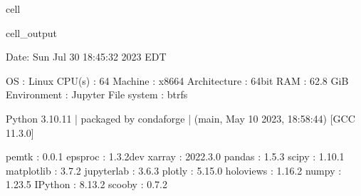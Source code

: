 \documentclass[letterpaper,table,10pt,english]{jupyterBook}
\begin{document}
\begin{sphinxuseclass}{cell}
\begin{sphinxVerbatimOutput}
\begin{sphinxuseclass}{cell_output}
\begin{sphinxVerbatim}[commandchars=\\\{\}]
\PYGZhy{}\PYGZhy{}\PYGZhy{}\PYGZhy{}\PYGZhy{}\PYGZhy{}\PYGZhy{}\PYGZhy{}\PYGZhy{}\PYGZhy{}\PYGZhy{}\PYGZhy{}\PYGZhy{}\PYGZhy{}\PYGZhy{}\PYGZhy{}\PYGZhy{}\PYGZhy{}\PYGZhy{}\PYGZhy{}\PYGZhy{}\PYGZhy{}\PYGZhy{}\PYGZhy{}\PYGZhy{}\PYGZhy{}\PYGZhy{}\PYGZhy{}\PYGZhy{}\PYGZhy{}\PYGZhy{}\PYGZhy{}\PYGZhy{}\PYGZhy{}\PYGZhy{}\PYGZhy{}\PYGZhy{}\PYGZhy{}\PYGZhy{}\PYGZhy{}\PYGZhy{}\PYGZhy{}\PYGZhy{}\PYGZhy{}\PYGZhy{}\PYGZhy{}\PYGZhy{}\PYGZhy{}\PYGZhy{}\PYGZhy{}\PYGZhy{}\PYGZhy{}\PYGZhy{}\PYGZhy{}\PYGZhy{}\PYGZhy{}\PYGZhy{}\PYGZhy{}\PYGZhy{}\PYGZhy{}\PYGZhy{}\PYGZhy{}\PYGZhy{}\PYGZhy{}\PYGZhy{}\PYGZhy{}\PYGZhy{}\PYGZhy{}\PYGZhy{}\PYGZhy{}\PYGZhy{}\PYGZhy{}\PYGZhy{}\PYGZhy{}\PYGZhy{}\PYGZhy{}\PYGZhy{}\PYGZhy{}\PYGZhy{}\PYGZhy{}
  Date: Sun Jul 30 18:45:32 2023 EDT

                OS : Linux
            CPU(s) : 64
           Machine : x86\PYGZus{}64
      Architecture : 64bit
               RAM : 62.8 GiB
       Environment : Jupyter
       File system : btrfs

  Python 3.10.11 | packaged by conda\PYGZhy{}forge | (main, May 10 2023, 18:58:44)
  [GCC 11.3.0]

             pemtk : 0.0.1
           epsproc : 1.3.2\PYGZhy{}dev
            xarray : 2022.3.0
            pandas : 1.5.3
             scipy : 1.10.1
        matplotlib : 3.7.2
        jupyterlab : 3.6.3
            plotly : 5.15.0
         holoviews : 1.16.2
             numpy : 1.23.5
           IPython : 8.13.2
            scooby : 0.7.2
\PYGZhy{}\PYGZhy{}\PYGZhy{}\PYGZhy{}\PYGZhy{}\PYGZhy{}\PYGZhy{}\PYGZhy{}\PYGZhy{}\PYGZhy{}\PYGZhy{}\PYGZhy{}\PYGZhy{}\PYGZhy{}\PYGZhy{}\PYGZhy{}\PYGZhy{}\PYGZhy{}\PYGZhy{}\PYGZhy{}\PYGZhy{}\PYGZhy{}\PYGZhy{}\PYGZhy{}\PYGZhy{}\PYGZhy{}\PYGZhy{}\PYGZhy{}\PYGZhy{}\PYGZhy{}\PYGZhy{}\PYGZhy{}\PYGZhy{}\PYGZhy{}\PYGZhy{}\PYGZhy{}\PYGZhy{}\PYGZhy{}\PYGZhy{}\PYGZhy{}\PYGZhy{}\PYGZhy{}\PYGZhy{}\PYGZhy{}\PYGZhy{}\PYGZhy{}\PYGZhy{}\PYGZhy{}\PYGZhy{}\PYGZhy{}\PYGZhy{}\PYGZhy{}\PYGZhy{}\PYGZhy{}\PYGZhy{}\PYGZhy{}\PYGZhy{}\PYGZhy{}\PYGZhy{}\PYGZhy{}\PYGZhy{}\PYGZhy{}\PYGZhy{}\PYGZhy{}\PYGZhy{}\PYGZhy{}\PYGZhy{}\PYGZhy{}\PYGZhy{}\PYGZhy{}\PYGZhy{}\PYGZhy{}\PYGZhy{}\PYGZhy{}\PYGZhy{}\PYGZhy{}\PYGZhy{}\PYGZhy{}\PYGZhy{}\PYGZhy{}
\end{sphinxVerbatim}

\end{sphinxuseclass}\end{sphinxVerbatimOutput}

\end{sphinxuseclass}
\end{document}
